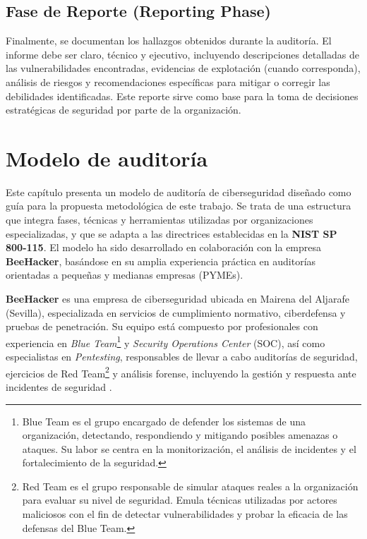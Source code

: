 \documentclass[a4paper, 11pt]{article}
\begin{document}
\subsection{Fase de Reporte (Reporting Phase)}

Finalmente, se documentan los hallazgos obtenidos durante la auditoría. El informe debe ser claro, técnico y ejecutivo, incluyendo descripciones detalladas de las vulnerabilidades encontradas, evidencias de explotación (cuando corresponda), análisis de riesgos y recomendaciones específicas para mitigar o corregir las debilidades identificadas. Este reporte sirve como base para la toma de decisiones estratégicas de seguridad por parte de la organización.


\clearpage
\thispagestyle{nohead}



\section{Modelo de auditoría}

Este capítulo presenta un modelo de auditoría de ciberseguridad diseñado como guía para la propuesta metodológica de este trabajo. 
Se trata de una estructura que integra fases, técnicas y herramientas utilizadas por organizaciones especializadas, y que se adapta a 
las directrices establecidas en la \textbf{NIST SP 800-115}. El modelo ha sido desarrollado en colaboración con la empresa \textbf{BeeHacker}, basándose en su amplia experiencia práctica en auditorías orientadas a pequeñas y medianas empresas (PYMEs).


\textbf{BeeHacker} es una empresa de ciberseguridad ubicada en Mairena del Aljarafe (Sevilla), especializada en servicios de cumplimiento normativo, 
ciberdefensa y pruebas de penetración. Su equipo está compuesto por profesionales con experiencia en \textit{Blue Team}\footnote{Blue Team es el grupo encargado de defender los sistemas de una organización, detectando, respondiendo y mitigando posibles amenazas o ataques. Su labor se centra en la monitorización, el análisis de incidentes y el fortalecimiento de la seguridad.} y \textit{Security Operations Center} (SOC), así como especialistas en \textit{Pentesting}, responsables de llevar a cabo auditorías de seguridad, ejercicios de Red Team\footnote{Red Team es el grupo responsable de simular ataques reales a la organización para evaluar su nivel de seguridad. Emula técnicas utilizadas por actores maliciosos con el fin de detectar vulnerabilidades y probar la eficacia de las defensas del Blue Team.} y análisis forense, incluyendo la gestión y respuesta ante incidentes de seguridad \cite{beehacker}.
\end{document}
